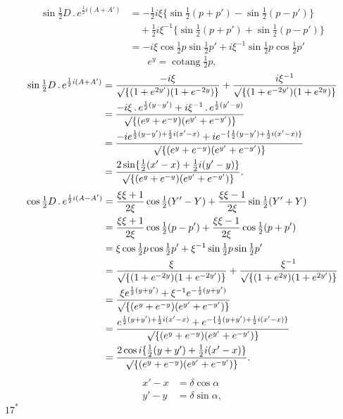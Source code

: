 \[
\begin{aligned}
\sin\tfrac12D\,.\,e^{\frac12i(A+A')}
 &=-\tfrac12i\xi\{\sin\tfrac12(p+p')-\sin\tfrac12(p-p')\}\\
 &\quad+\tfrac12i\xi^{-1}\{\sin\tfrac12(p+p')+\sin\tfrac12(p-p')\}\\
 &=-i\xi\cos\tfrac12p\sin\tfrac12p'+i\xi^{-1}\sin\tfrac12p\cos\tfrac12p'
\end{aligned}
\]
\noindent [or, since]
\[
e^y=\operatorname{cotang}\tfrac12p,
\]
\[
\begin{aligned}
\sin\tfrac12D\,.\,e^{\frac12i(A+A')}
 &=\frac{-i\xi}{\surd\{(1+e^{2y'})(1+e^{-2y})\}}
 +\frac{i\xi^{-1}}{\surd\{(1+e^{-2y'})(1+e^{2y})\}}\\
 &=\frac{-i\xi\,.\,e^{\frac12(y-y')}+i\xi^{-1}\,.\,e^{\frac12(y'-y)}}
 {\surd\{(e^y+e^{-y})(e^{y'}+e^{-y'})\}}\\
 &=\frac{-ie^{\frac12(y-y')+\frac12i(x'-x)}
 +ie^{-\{\frac12(y-y')+\frac12i(x'-x)\}}}{\surd\{(e^y+e^{-y})(e^{y'}+e^{-y'})\}}\\
 &=\frac{2\sin\{\tfrac12(x'-x)+\tfrac12i(y'-y)\}}
 {\surd\{(e^y+e^{-y})(e^{y'}+e^{-y'})\}}.
\end{aligned}
\]
\noindent [Likewise]
\[
\begin{aligned}
\cos\tfrac12D\,.\,e^{\frac12i(A-A')}
 &=\frac{\xi\xi+1}{2\xi}\cos\tfrac12(Y'-Y)
 +\frac{\xi\xi-1}{2\xi}\sin\tfrac12(Y'+Y)\\
 &=\frac{\xi\xi+1}{2\xi}\cos\tfrac12(p-p')
 +\frac{\xi\xi-1}{2\xi}\cos\tfrac12(p+p')\\
 &=\xi\cos\tfrac12p\cos\tfrac12p'
 +\xi^{-1}\sin\tfrac12p\sin\tfrac12p'\\
 &=\frac{\xi}{\surd\{(1+e^{-2y})(1+e^{-2y'})\}}
 +\frac{\xi^{-1}}{\surd\{(1+e^{2y})(1+e^{2y'})\}}\\
 &=\frac{\xi e^{\frac12(y+y')}+\xi^{-1}e^{-\frac12(y+y')}}
 {\surd\{(e^y+e^{-y})(e^{y'}+e^{-y'})\}}\\
 &=\frac{e^{\frac12(y+y')+\frac12i(x'-x)}
 +e^{-\{\frac12(y+y')+\frac12i(x'-x)\}}}{\surd\{(e^y+e^{-y})(e^{y'}+e^{-y'})\}}\\
 &=\frac{2\cos i\{\tfrac12(y+y')+\tfrac12i(x'-x)\}}
 {\surd\{(e^y+e^{-y})(e^{y'}+e^{-y'})\}}.
\end{aligned}
\]
\[
\begin{aligned}
x'-x&=\delta\cos\alpha\\
y'-y&=\delta\sin\alpha,
\end{aligned}
\]
\noindent\hfill \(17^{*}\)\hspace*{.13\linewidth}\par
\endgroup

